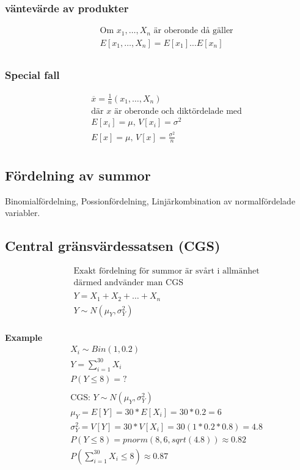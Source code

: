 \begin{multicols}{2}
\subsubsection{väntevärde av produkter}
\begin{align*}
  &\quad  \text{Om $x_1,\ldots,X_n$ är oberonde då gäller}\\
  &\quad  E[x_1,\ldots,X_n] = E[x_1] \ldots E[x_n] \\
\end{align*}

\subsubsection{Special fall}
\begin{align*}
  &\quad  \overline{x} = \frac{1}{n}(x_1,\ldots,X_n) \\
  &\quad  \text{där $x$ är oberonde och diktördelade med} \\
  &\quad  E[x_i] = \mu, \, V[x_i] = \sigma^2 \\
  &\quad  E[x] = \mu, \, V[x] = \frac{\sigma^2}{n} \\
\end{align*}

\subsection{Fördelning av summor}
Binomialfördelning, Possionfördelning, Linjärkombination av normalfördelade variabler.

\subsection{Central gränsvärdessatsen (CGS)}
\begin{align*}
  &\quad  \text{Exakt fördelning för summor är svårt i allmänhet} \\
  &\quad  \text{därmed andvänder man CGS} \\
  &\quad  \\
  &\quad  Y = X_1+X_2+\ldots+X_n \\
  &\quad  Y \sim N(\mu_Y, \sigma_Y^2) \\
\end{align*}

\textbf{Example}
\begin{align*}
  &\quad  X_i \sim Bin(1,0.2) \\
  &\quad  Y=\sum_{i=1}^{30} X_i \\
  &\quad  P(Y\leq8)=? \\
  &\quad  \\
  &\quad  \text{CGS: } Y\sim{N(\mu_Y, \sigma_Y^2)} \\
  &\quad  \mu_Y=E[Y]=30*E[X_i]=30*0.2=6 \\
  &\quad  \sigma_Y^2=V[Y]=30*V[X_i]=30(1*0.2*0.8)=4.8 \\
  &\quad  P(Y\leq8)=pnorm(8, 6, sqrt(4.8))\approx 0.82 \\
  &\quad  P(\sum_{i=1}^{30} X_i\leq8)\approx 0.87 \\
\end{align*}


\end{multicols}
